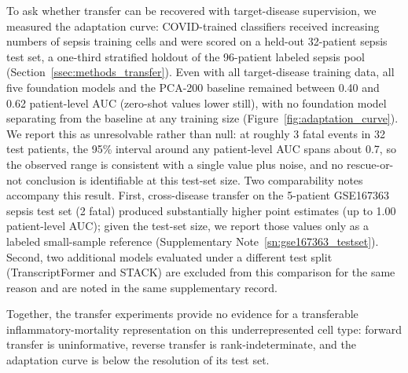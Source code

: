 \documentclass[11pt,a4paper]{article}
\begin{document}
To ask whether transfer can be recovered with target-disease supervision, we
measured the adaptation curve: COVID-trained classifiers received increasing
numbers of sepsis training cells and were scored on a held-out 32-patient
sepsis test set, a one-third stratified holdout of the 96-patient labeled
sepsis pool (Section~\ref{ssec:methods_transfer}). Even with all
target-disease training data, all five foundation models and the PCA-200
baseline remained between 0.40 and 0.62 patient-level AUC (zero-shot values
lower still), with no foundation model separating from the baseline at any
training size (Figure~\ref{fig:adaptation_curve}). We report this as
unresolvable rather than null: at roughly 3 fatal events in 32 test patients,
the 95\% interval around any patient-level AUC spans about 0.7, so the
observed range is consistent with a single value plus noise, and no
rescue-or-not conclusion is identifiable at this test-set size. Two
comparability notes accompany this result. First, cross-disease
transfer on the 5-patient GSE167363 sepsis test set (2 fatal) produced
substantially higher point estimates (up to 1.00 patient-level AUC); given
the test-set size, we report those values
only as a labeled small-sample reference (Supplementary Note~\ref{sn:gse167363_testset}). Second, two additional
models evaluated under a different test split (TranscriptFormer and STACK) are
excluded from this comparison for the same reason and are noted in the same
supplementary record.

Together, the transfer experiments provide no evidence for a transferable
inflammatory-mortality representation on this underrepresented cell type:
forward transfer is uninformative, reverse transfer is rank-indeterminate,
and the adaptation curve is below the resolution of its test set.
\end{document}
